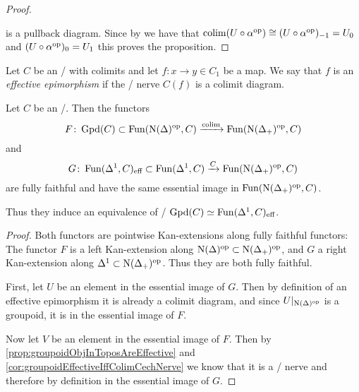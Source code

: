 \begin{prop}
\begin{proof}
\begin{center}
        \end{center}
        is a pullback diagram.
        Since by %
        we have that $\operatorname{colim} (U\circ\alpha^{\operatorname{op}})\cong(U\circ\alpha^{\operatorname{op}})_{-1} = U_0$ and $(U\circ\alpha^{\operatorname{op}})_0=U_1$ this proves the proposition.
    \end{proof}
\end{prop}
\begin{definition}
    Let $C$ be an \inftycat/ with colimits and let $f\colon x\to y\in C_1$ be a map.
    We say that $f$ is an \emph{effective epimorphism} if the \Cech/ nerve $C(f)$ is a colimit diagram.
\end{definition}
\begin{prop}\label{prop:mayRecognitionTheoremGroupoid}
    Let $C$ be an \inftytop/. 
    Then the functors
    \begin{equation*}
        F\colon\operatorname{Gpd}(C)\subset\operatorname{Fun}(\operatorname{N}(\Delta)^{\operatorname{op}},C)\xrightarrow{\operatorname{colim}}\operatorname{Fun}(\operatorname{N}(\Delta_+)^{\operatorname{op}},C)
    \end{equation*}
    and 
    \begin{equation*}
        G\colon\operatorname{Fun}(\Delta^1,C)_{\text{eff}}\subset\operatorname{Fun}(\Delta^1,C)\xrightarrow{C}\operatorname{Fun}(\operatorname{N}(\Delta_+)^{\operatorname{op}},C)
    \end{equation*}
    are fully faithful and have the same essential image in $\operatorname{Fun}(\operatorname{N}(\Delta_+)^{\operatorname{op}},C)$.
    
    Thus they induce an equivalence of \inftycats/ $\operatorname{Gpd}(C)\simeq\operatorname{Fun}(\Delta^1,C)_{\text{eff}}$.
    \begin{proof}
        Both functors are pointwise Kan-extensions along fully faithful functors:
        The functor $F$ is a left Kan-extension along $\operatorname{N}(\Delta)^{\operatorname{op}}\subset\operatorname{N}(\Delta_+)^{\operatorname{op}}$, and $G$ a right Kan-extension along $\Delta^1\subset\operatorname{N}(\Delta_+)^{\operatorname{op}}$.
        Thus they are both fully faithful.

        First, let $U$ be an element in the essential image of $G$. 
        Then by definition of an effective epimorphism it is already a colimit diagram, and since $U|_{\operatorname{N}(\Delta)^{\operatorname{op}}}$ is a groupoid, it is in the essential image of $F$.

        Now let $V$ be an element in the essential image of $F$. 
        Then by \cref{prop:groupoidObjInToposAreEffective} and \cref{cor:groupoidEffectiveIffColimCechNerve} we know that it is a \Cech/ nerve and therefore by definition in the essential image of $G$.
    \end{proof}
\end{prop}
